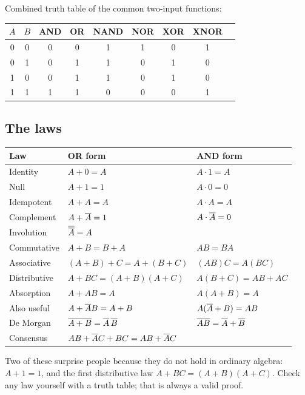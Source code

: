 Combined truth table of the common two-input functions:
\begin{center}
\begin{tabular}{cc|ccccccc}
\toprule
$A$ & $B$ & AND & OR & NAND & NOR & XOR & XNOR \\
\midrule
0 & 0 & 0 & 0 & 1 & 1 & 0 & 1 \\
0 & 1 & 0 & 1 & 1 & 0 & 1 & 0 \\
1 & 0 & 0 & 1 & 1 & 0 & 1 & 0 \\
1 & 1 & 1 & 1 & 0 & 0 & 0 & 1 \\
\bottomrule
\end{tabular}
\end{center}

\subsection*{The laws}

\begin{center}
\begin{tabular}{lll}
\toprule
Law & OR form & AND form \\
\midrule
Identity & $A + 0 = A$ & $A \cdot 1 = A$ \\
Null & $A + 1 = 1$ & $A \cdot 0 = 0$ \\
Idempotent & $A + A = A$ & $A \cdot A = A$ \\
Complement & $A + \overline{A} = 1$ & $A \cdot \overline{A} = 0$ \\
Involution & \multicolumn{2}{l}{$\overline{\overline{A}} = A$} \\
Commutative & $A + B = B + A$ & $AB = BA$ \\
Associative & $(A+B)+C = A+(B+C)$ & $(AB)C = A(BC)$ \\
Distributive & $A + BC = (A+B)(A+C)$ & $A(B+C) = AB + AC$ \\
Absorption & $A + AB = A$ & $A(A+B) = A$ \\
Also useful & $A + \overline{A}B = A + B$ & $A(\overline{A} + B) = AB$ \\
De Morgan & $\overline{A + B} = \overline{A}\,\overline{B}$ & $\overline{AB} = \overline{A} + \overline{B}$ \\
Consensus & \multicolumn{2}{l}{$AB + \overline{A}C + BC = AB + \overline{A}C$} \\
\bottomrule
\end{tabular}
\end{center}

Two of these surprise people because they do not hold in ordinary algebra: $A + 1 = 1$, and the first distributive law $A + BC = (A+B)(A+C)$. Check any law yourself with a truth table; that is always a valid proof.

